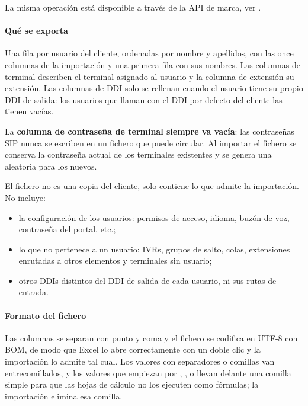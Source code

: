 \documentclass[letterpaper,10pt,spanish]{sphinxmanual}
\begin{document}
La misma operación está disponible a través de la API de marca, ver {\hyperref[administration_portal/brand/clients/virtual_pbx:users\string-mass\string-export\string-api]{}}.


\paragraph{Qué se exporta}
\label{administration_portal/brand/clients/virtual_pbx:what-is-exported}
Una fila por usuario del cliente, ordenadas por nombre y apellidos, con las once columnas de la importación y una primera fila con sus nombres. Las columnas de terminal describen el terminal asignado al usuario y la columna de extensión su extensión. Las columnas de DDI solo se rellenan cuando el usuario tiene su propio DDI de salida: los usuarios que llaman con el DDI por defecto del cliente las tienen vacías.

La \textbf{columna de contraseña de terminal siempre va vacía}: las contraseñas SIP nunca se escriben en un fichero que puede circular. Al importar el fichero se conserva la contraseña actual de los terminales existentes y se genera una aleatoria para los nuevos.

El fichero no es una copia del cliente, solo contiene lo que admite la importación. No incluye:
\begin{itemize}
\item {} 
la configuración de los usuarios: permisos de acceso, idioma, buzón de voz, contraseña del portal, etc.;

\item {} 
lo que no pertenece a un usuario: IVRs, grupos de salto, colas, extensiones enrutadas a otros elementos y terminales sin usuario;

\item {} 
otros DDIs distintos del DDI de salida de cada usuario, ni sus rutas de entrada.

\end{itemize}


\paragraph{Formato del fichero}
\label{administration_portal/brand/clients/virtual_pbx:file-format}
Las columnas se separan con punto y coma y el fichero se codifica en UTF-8 con BOM, de modo que Excel lo abre correctamente con un doble clic y la importación lo admite tal cual. Los valores con separadores o comillas van entrecomillados, y los valores que empiezan por \sphinxcode{=}, \sphinxcode{+}, \sphinxcode{-} o  llevan delante una comilla simple para que las hojas de cálculo no los ejecuten como fórmulas; la importación elimina esa comilla.
\end{document}
